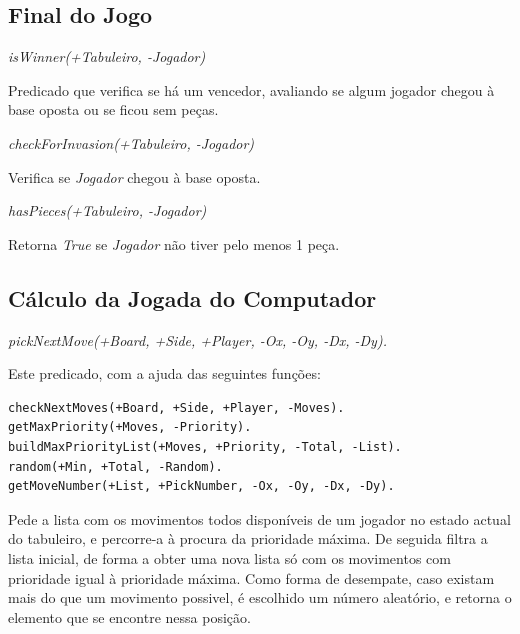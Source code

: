 \documentclass[15pt,a4paper]{article}
\begin{document}





\subsection{Final do Jogo}
\textit{isWinner(+Tabuleiro, -Jogador)}

Predicado que verifica se há um vencedor, avaliando se algum jogador chegou à base oposta ou se ficou
sem peças.

\textit{checkForInvasion(+Tabuleiro, -Jogador)}

Verifica se \textit{Jogador} chegou à base oposta.

\textit{hasPieces(+Tabuleiro, -Jogador)}

Retorna \textit{True} se \textit{Jogador} não tiver pelo menos 1 peça.


\subsection{Cálculo da Jogada do Computador}

\textit{pickNextMove(+Board, +Side, +Player, -Ox, -Oy, -Dx, -Dy).}

Este predicado, com a ajuda das seguintes funções:
\begin{lstlisting}
checkNextMoves(+Board, +Side, +Player, -Moves).
getMaxPriority(+Moves, -Priority).
buildMaxPriorityList(+Moves, +Priority, -Total, -List).
random(+Min, +Total, -Random).
getMoveNumber(+List, +PickNumber, -Ox, -Oy, -Dx, -Dy).
\end{lstlisting}

Pede a lista com os movimentos todos disponíveis de um jogador no estado actual do tabuleiro, e percorre-a à procura da prioridade máxima. De seguida filtra a lista inicial, de forma
a obter uma nova lista só com os movimentos com prioridade igual à prioridade máxima. Como forma de desempate, caso existam mais do que um movimento possivel,
é escolhido um número aleatório, e retorna o elemento que se encontre nessa posição.
\end{document}
